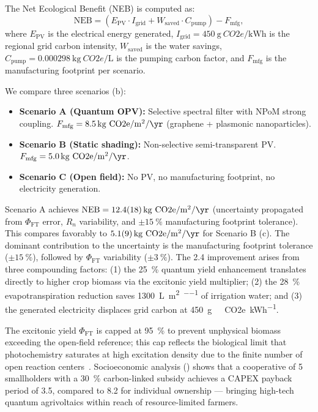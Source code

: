 \documentclass[12pt]{article}
\begin{document}
The Net Ecological Benefit (NEB) is computed as:
\begin{equation}
\mathrm{NEB} = \left( E_{\mathrm{PV}} \cdot I_{\mathrm{grid}} + W_{\mathrm{saved}} \cdot C_{\mathrm{pump}} \right) - F_{\mathrm{mfg}},
\label{eq:neb}
\end{equation}
where $E_{\mathrm{PV}}$ is the electrical energy generated, $I_{\mathrm{grid}} = \SI{450}{\g\ CO2e\per\kWh}$ is the regional grid carbon intensity, $W_{\mathrm{saved}}$ is the water savings, $C_{\mathrm{pump}} = \SI{0.000298}{\kg\ CO2e\per\L}$ is the pumping carbon factor, and $F_{\mathrm{mfg}}$ is the manufacturing footprint per scenario.

We compare three scenarios (b):
\begin{itemize}
\item \textbf{Scenario A (Quantum OPV):} Selective spectral filter with NPoM strong coupling.\newline
$F_{\mathrm{mfg}} = \SI{8.5}{\kg\ CO2e\per\m\squared\per\yr}$ (graphene + plasmonic nanoparticles).
\item \textbf{Scenario B (Static shading):} Non-selective semi-transparent PV.\newline
$F_{\mathrm{mfg}} = \SI{5.0}{\kg\ CO2e\per\m\squared\per\yr}$.
\item \textbf{Scenario C (Open field):} No PV, no manufacturing footprint, no electricity generation.
\end{itemize}

Scenario A achieves $\mathrm{NEB} = \SI{12.4 \pm 1.8}{\kg\ CO2e\per\m\squared\per\yr}$ (uncertainty propagated from $\Phi_{\mathrm{FT}}$ error, $R_n$ variability, and $\pm\SI{15}{\percent}$ manufacturing footprint tolerance).
This compares favorably to $\SI{5.1 \pm 0.9}{\kg\ CO2e\per\m\squared\per\yr}$ for Scenario B (c).
The dominant contribution to the uncertainty is the manufacturing footprint tolerance ($\pm\SI{15}{\percent}$), followed by $\Phi_{\mathrm{FT}}$ variability ($\pm\SI{3}{\percent}$).
The \SI{2.4}{\times} improvement arises from three compounding factors: (1) the \SI{25}{\percent} quantum yield enhancement translates directly to higher crop biomass via the excitonic yield multiplier; (2) the \SI{28}{\percent} evapotranspiration reduction saves \SI{1300}{\L\per\m\squared\per\yr} of irrigation water; and (3) the generated electricity displaces grid carbon at \SI{450}{\g\ CO2e\per\kWh}.

The excitonic yield $\Phi_{\mathrm{FT}}$ is capped at \SI{95}{\percent} to prevent unphysical biomass exceeding the open-field reference; this cap reflects the biological limit that photochemistry saturates at high excitation density due to the finite number of open reaction centers~\cite{Renger2003}.
Socioeconomic analysis () shows that a cooperative of 5 smallholders with a \SI{30}{\percent} carbon-linked subsidy achieves a CAPEX payback period of \SI{3.5}{\yr}, compared to \SI{8.2}{\yr} for individual ownership --- bringing high-tech quantum agrivoltaics within reach of resource-limited farmers.
\end{document}
